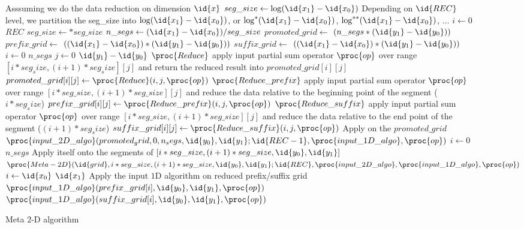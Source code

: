 
\begin{figure}[!ht]
\small
\begin{codebox}
\li     \Comment Asssuming we do the data reduction on dimension $\id{x}$
\li     $seg\_size \gets \log(\id{x_1} - \id{x_0})$
\li     \Comment Depending on $\id{REC}$ level, we partition the seg\_size into $\log (\id{x_1} - \id{x_0})$, or $\log^* (\id{x_1} - \id{x_0})$, $\log^{**} (\id{x_1} - \id{x_0})$, $\ldots$
\li     \For $i \gets 0$ \To $REC$ 
\li         \Do $seg\_size \gets * seg\_size$ \End
\li     $n\_segs \gets (\id{x_1} - \id{x_0})/seg\_size$
\li     $promoted\_grid \gets $ \New $(n\_segs * (\id{y_1} - \id{y_0}))$
\li     $prefix\_grid \gets $ \New $((\id{x_1} - \id{x_0}) * (\id{y_1} - \id{y_0}))$
\li     $suffix\_grid \gets $ \New $((\id{x_1} - \id{x_0}) * (\id{y_1} - \id{y_0}))$
\li     \For $i \gets 0$ \To $n\_segs$
\li         \Do \For $j \gets 0$ \To $\id{y_1} - \id{y_0}$
\li             \Do \Comment $\proc{Reduce}$ apply input partial sum operator $\proc{op}$ over range $[i*seg_size, (i+1)*seg_size][j]$ 
\zi                 \Comment and return the reduced result into $promoted\_grid[i][j]$
\li                 $promoted\_grid[i][j] \gets \proc{Reduce}(i, j, \proc{op})$ 
\li                 \Comment $\proc{Reduce\_prefix}$ apply input partial sum operator $\proc{op}$ over range $[i*seg\_size, (i+1)*seg\_size][j]$ 
\zi                 \Comment and reduce the data relative to the beginning point of the segment ($i*seg_size$)
\li                 $prefix\_grid[i][j] \gets \proc{Reduce\_prefix}(i, j, \proc{op})$
\li                 \Comment $\proc{Reduce\_suffix}$ apply input partial sum operator $\proc{op}$ over range $[i*seg\_size, (i+1)*seg\_size][j]$ 
\zi                 \Comment and reduce the data relative to the end point of the segment ($(i+1)*seg_size$)
\li                 $suffix\_grid[i][j] \gets \proc{Reduce\_suffix}(i, j, \proc{op})$ \End \End
\li     \Comment Apply  on the $promoted\_grid$
\li     $\proc{input\_2D\_algo}(promoted_grid, 0, n_segs, \id{y_0}, \id{y_1}; \id{REC-1}, \proc{input\_1D\_algo}, \proc{op})$
\li     \Parfor $i \gets 0$ \To $n\_segs$
\li         \Do \Comment Apply  itself onto the segments of $[i * seg\_size, (i+1) * seg\_size, \id{y_0}, \id{y_1}]$
\li             $\proc{Meta-2D}(\id{grid}, i * seg\_size, (i+1) * seg\_size, \id{y_0}, \id{y_1}; \id{REC}, \proc{input\_2D\_algo}, \proc{input\_1D\_algo}, \proc{op})$ \End
\li     \Parfor $i \gets \id{x_0}$ \To $\id{x_1}$
\li         \Do \Comment Apply the input $1$D algorithm on reduced prefix/suffix grid
\li             $\proc{input\_1D\_algo}(prefix\_grid[i], \id{y_0}, \id{y_1}, \proc{op})$
\li             $\proc{input\_1D\_algo}(suffix\_grid[i], \id{y_0}, \id{y_1}, \proc{op})$ \End
\end{codebox}
\caption{Meta $2$-D algorithm}
\label{fig:meta-2D-algo}
\end{figure}

